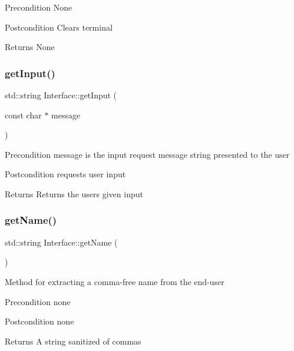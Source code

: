 \begin{DoxyPrecond}{Precondition}
None 
\end{DoxyPrecond}
\begin{DoxyPostcond}{Postcondition}
Clears terminal 
\end{DoxyPostcond}
\begin{DoxyReturn}{Returns}
None 
\end{DoxyReturn}
\mbox{\label{classInterface_aa5c0539404373d488986f030f7a84a6f}} 
\subsubsection{\texorpdfstring{get\+Input()}{getInput()}}
{\footnotesize\ttfamily std\+::string Interface\+::get\+Input (\begin{DoxyParamCaption}\item[{const char $\ast$}]{message }\end{DoxyParamCaption})\hspace{0.3cm}{\ttfamily [static]}}

\begin{DoxyPrecond}{Precondition}
message is the input request message string presented to the user 
\end{DoxyPrecond}
\begin{DoxyPostcond}{Postcondition}
requests user input 
\end{DoxyPostcond}
\begin{DoxyReturn}{Returns}
Returns the user\textquotesingle{}s given input 
\end{DoxyReturn}
\mbox{\label{classInterface_a73eee93e24c223cd265b5fb0ca1640b8}} 
\subsubsection{\texorpdfstring{get\+Name()}{getName()}}
{\footnotesize\ttfamily std\+::string Interface\+::get\+Name (\begin{DoxyParamCaption}{ }\end{DoxyParamCaption})}

Method for extracting a comma-\/free name from the end-\/user \begin{DoxyPrecond}{Precondition}
none 
\end{DoxyPrecond}
\begin{DoxyPostcond}{Postcondition}
none 
\end{DoxyPostcond}
\begin{DoxyReturn}{Returns}
A string sanitized of commas 
\end{DoxyReturn}
\mbox{\label{classInterface_a2e002e61dc11cf4a1bd9c039704194df}} 
